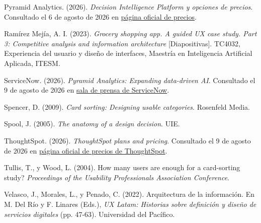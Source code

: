 \begin{uxreferencias}
Pyramid Analytics. (2026). \textit{Decision Intelligence Platform y opciones de precios}. Consultado el 6 de agosto de 2026 en \href{https://www.pyramidanalytics.com/decision-intelligence-platform/get-pricing/}{página oficial de precios}.

Ramírez Mejía, A. I. (2023). \textit{Grocery shopping app. A guided UX case study. Part 3:
Competitive analysis and information architecture} [Diapositivas]. TC4032, Experiencia del
usuario y diseño de interfaces, Maestría en Inteligencia Artificial Aplicada, ITESM.

ServiceNow. (2026). \textit{Pyramid Analytics: Expanding data-driven AI}. Consultado el 9 de agosto de 2026 en \href{https://www.servicenow.com/workflow/news/pyramid-analytics-expanding-data-driven-ai.html}{sala de prensa de ServiceNow}.

Spencer, D. (2009). \textit{Card sorting: Designing usable categories}. Rosenfeld Media.

Spool, J. (2005). \textit{The anatomy of a design decision}. UIE.

ThoughtSpot. (2026). \textit{ThoughtSpot plans and pricing}. Consultado el 9 de agosto de 2026 en \href{https://www.thoughtspot.com/pricing}{página oficial de precios de ThoughtSpot}.

Tullis, T., y Wood, L. (2004). How many users are enough for a card-sorting study?
\textit{Proceedings of the Usability Professionals Association Conference}.

Velasco, J., Morales, L., y Penado, C. (2022). Arquitectura de la información. En M. Del Río
y F. Linares (Eds.), \textit{UX Latam: Historias sobre definición y diseño de servicios
digitales} (pp. 47-63). Universidad del Pacífico.
\end{uxreferencias}

